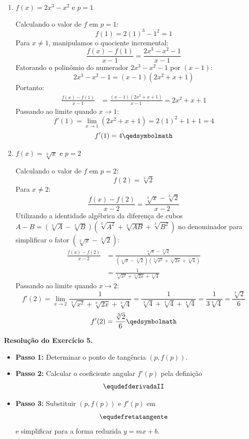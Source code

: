 \begin{enumerate}[label=\alph*)]
    \item $f(x) = 2x^3 - x^2$ e $p = 1$

    Calculando o valor de $f$ em $p = 1$:
    \[
    f(1) = 2(1)^3 - 1^2 = 1
    \]
    Para $x \neq 1$, manipulamos o quociente incremental:
    \[
    \frac{f(x) - f(1)}{x - 1} = \frac{2x^3 - x^2 - 1}{x - 1}
    \]
    Fatorando o polinômio do numerador $2x^3 - x^2 - 1$ por $(x - 1)$:
    \[
    2x^3 - x^2 - 1 = (x - 1)(2x^2 + x + 1)
    \]
    Portanto:
    \begin{align*}
        \frac{f(x) - f(1)}{x - 1} &= \frac{(x - 1)(2x^2 + x + 1)}{x - 1} = 2x^2 + x + 1
    \end{align*}
    Passando ao limite quando $x \to 1$:
    \[
    f'(1) = \lim_{x \to 1} (2x^2 + x + 1) = 2(1)^2 + 1 + 1 = 4
    \]
    \[
    f'(1) = 4 \qedsymbolmath
    \]

    \item $f(x) = \sqrt[3]{x}$ e $p = 2$

    Calculando o valor de $f$ em $p = 2$:
    \[
    f(2) = \sqrt[3]{2}
    \]
    Para $x \neq 2$:
    \[
    \frac{f(x) - f(2)}{x - 2} = \frac{\sqrt[3]{x} - \sqrt[3]{2}}{x - 2}
    \]
    Utilizando a identidade algébrica da diferença de cubos $A - B = (\sqrt[3]{A} - \sqrt[3]{B})\left(\sqrt[3]{A^2} + \sqrt[3]{AB} + \sqrt[3]{B^2}\right)$ no denominador para simplificar o fator $(\sqrt[3]{x} - \sqrt[3]{2})$:
    \begin{align*}
        \frac{f(x) - f(2)}{x - 2} &= \frac{\sqrt[3]{x} - \sqrt[3]{2}}{(\sqrt[3]{x} - \sqrt[3]{2})\left(\sqrt[3]{x^2} + \sqrt[3]{2x} + \sqrt[3]{4}\right)} \\[0.25cm]
        &= \frac{1}{\sqrt[3]{x^2} + \sqrt[3]{2x} + \sqrt[3]{4}}
    \end{align*}
    Passando ao limite quando $x \to 2$:
    \[
    f'(2) = \lim_{x \to 2} \frac{1}{\sqrt[3]{x^2} + \sqrt[3]{2x} + \sqrt[3]{4}} = \frac{1}{\sqrt[3]{4} + \sqrt[3]{4} + \sqrt[3]{4}} = \frac{1}{3\sqrt[3]{4}} = \frac{\sqrt[3]{2}}{6}
    \]
    \[
    f'(2) = \frac{\sqrt[3]{2}}{6} \qedsymbolmath
    \]
\end{enumerate}

\vspace{0.6cm}
\noindent\textbf{Resolução do Exercício 5.}
\label{res:7.2.5}
\setcounter{equation}{0}

\begin{estrategiabox}[title=Estratégia Geral]
  \begin{itemize}[noitemsep, topsep=2pt]
    \item \textbf{Passo 1:} Determinar o ponto de tangência $(p, f(p))$.
    \item \textbf{Passo 2:} Calcular o coeficiente angular $f'(p)$ pela definição \[\equdefderivadaII\]
    \item \textbf{Passo 3:} Substituir $(p, f(p))$ e $f'(p)$ em \[\equdefretatangente\] e simplificar para a forma reduzida $y = mx + b$.
  \end{itemize}
\end{estrategiabox}

